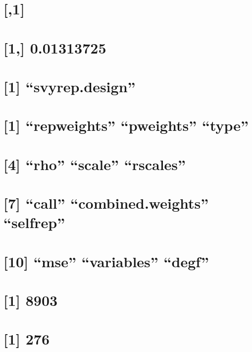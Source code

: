 \documentclass[]{book}
\theoremstyle{definition}
\theoremstyle{definition}
\theoremstyle{definition}
\theoremstyle{remark}
\begin{document}
\section{{[},1{]}}\label{section-12}

\section{{[}1,{]} 0.01313725}\label{section-13}

\section{\texorpdfstring{{[}1{]}
``svyrep.design''}{{[}1{]} svyrep.design}}\label{svyrep.design}

\section{\texorpdfstring{{[}1{]} ``repweights'' ``pweights''
``type''}{{[}1{]} repweights pweights type}}\label{repweights-pweights-type}

\section{\texorpdfstring{{[}4{]} ``rho'' ``scale''
``rscales''}{{[}4{]} rho scale rscales}}\label{rho-scale-rscales}

\section{\texorpdfstring{{[}7{]} ``call'' ``combined.weights''
``selfrep''}{{[}7{]} call combined.weights selfrep}}\label{call-combined.weights-selfrep}

\section{\texorpdfstring{{[}10{]} ``mse'' ``variables''
``degf''}{{[}10{]} mse variables degf}}\label{mse-variables-degf}

\section{{[}1{]} 8903}\label{section-14}

\section{{[}1{]} 276}\label{section-15}
\end{document}
